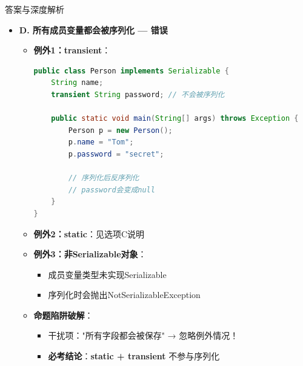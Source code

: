 \documentclass[12pt, a4paper]{ctexart}
\begin{document}
\begin{bluebox}{答案与深度解析}
\begin{itemize}[label={}, nosep]
\begin{itemize}[label={}, leftmargin=*, nosep]
\begin{lstlisting}[language=Java]
        // 序列化
        ByteArrayOutputStream baos = new ByteArrayOutputStream();
        ObjectOutputStream oos = new ObjectOutputStream(baos);
        oos.writeObject(p);
        oos.close();

        // 反序列化
        ByteArrayInputStream bais = new ByteArrayInputStream(baos.toByteArray());
        ObjectInputStream ois = new ObjectInputStream(bais);
        Person p2 = (Person) ois.readObject();

        System.out.println(p2.count); // 输出0，非100！static未被序列化
    }
}
      \end{lstlisting}
		\end{itemize}

		\item \textbf{D. 所有成员变量都会被序列化 — 错误}
		\begin{itemize}[label={}, leftmargin=*, nosep]
			\item \textbf{例外1：transient}：
			      \begin{lstlisting}[language=Java]
public class Person implements Serializable {
    String name;
    transient String password; // 不会被序列化

    public static void main(String[] args) throws Exception {
        Person p = new Person();
        p.name = "Tom";
        p.password = "secret";

        // 序列化后反序列化
        // password会变成null
    }
}
      \end{lstlisting}

			\item \textbf{例外2：static}：见选项C说明

			\item \textbf{例外3：非Serializable对象}：
			      \begin{itemize}[label={}, nosep]
				      \item 成员变量类型未实现Serializable
				      \item 序列化时会抛出NotSerializableException
			      \end{itemize}

			\item \textbf{命题陷阱破解}：
			      \begin{itemize}[label={}, nosep]
				      \item 干扰项："所有字段都会被保存" → 忽略例外情况！
				      \item \textbf{必考结论}：\textbf{static + transient} 不参与序列化
			      \end{itemize}
		\end{itemize}
	\end{itemize}


\end{bluebox}
\end{document}
